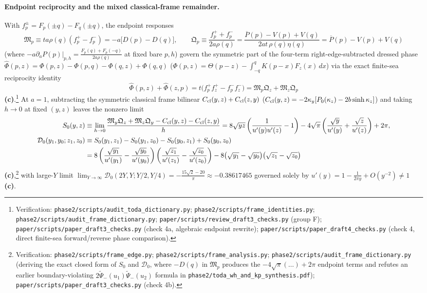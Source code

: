 \documentclass[11pt,a4paper]{article}
\newcommand{\lab}[1]{{\normalfont\sffamily\footnotesize\bfseries(#1)}}
\newcommand{\Lc}{\lab{c}}
\newcommand{\scr}[1]{\nolinkurl{#1}}
\newcommand{\chk}[1]{\footnote{\raggedright Verification: #1.}}
\theoremstyle{remark}
\begin{document}
\paragraph{Endpoint reciprocity and the mixed classical-frame remainder.} With $f_p^\pm=F_p(\pm q)-F_q(\pm q)$, the endpoint responses
\begin{equation}\label{eq:MQresp}
\mathfrak M_p\equiv ta\rho(q)(f_p^+-f_p^-)=-a\big[D(p)-D(q)\big],\qquad
\mathfrak Q_p\equiv\frac{f_p^++f_p^-}{2a\rho(q)}=\frac{\overline P(p)-V(p)+V(q)}{2at\,\rho(q)\eta(q)}=\overline P(p)-V(p)+V(q)
\end{equation}
(where $-a\partial_aP(p)|_{p,h}=\frac{F_p(q)+F_p(-q)}{2a\rho(q)}$ at fixed bare $p,h$) govern the symmetric part of the four-term right-edge-subtracted dressed phase $\widehat\Phi(p,z)=\Phi(p,z)-\Phi(p,q)-\Phi(q,z)+\Phi(q,q)$ ($\Phi(p,z)=\Theta(p-z)-\int_{-q}^qK(p-x)F_z(x)\,dx$) via the exact finite-sea reciprocity identity
\begin{equation}\label{eq:recip4}
\widehat\Phi(p,z)+\widehat\Phi(z,p)=t\big(f_p^+f_z^+-f_p^-f_z^-\big)=\mathfrak M_p\mathfrak Q_z+\mathfrak M_z\mathfrak Q_p
\end{equation}
\Lc.\chk{\scr{phase2/scripts/audit_toda_dictionary.py}; \scr{phase2/scripts/frame_identities.py}; \scr{phase2/scripts/audit_frame_dictionary.py}; \scr{paper/scripts/review_draft3_checks.py} (group F); \scr{paper/scripts/paper_draft3_checks.py} (check 4a, algebraic endpoint rewrite); \scr{paper/scripts/paper_draft4_checks.py} (check 4, direct finite-sea forward/reverse phase comparison)}
At $a=1$, subtracting the symmetric classical frame bilinear $C_{\rm cl}(y,z)+C_{\rm cl}(z,y)$ ($C_{\rm cl}(y,z)=-2\kappa_y[P_0(\kappa_z)-2b\sinh\kappa_z]$) and taking $h\to0$ at fixed $(y,z)$ leaves the nonzero limit
\begin{equation}\label{eq:S0D0}
\begin{aligned}
S_0(y,z)&\equiv\lim_{h\to0}\frac{\mathfrak M_y\mathfrak Q_z+\mathfrak M_z\mathfrak Q_y-C_{\rm cl}(y,z)-C_{\rm cl}(z,y)}{h}
=8\sqrt{yz}\left(\frac1{u'(y)u'(z)}-1\right)-4\sqrt\pi\left(\frac{\sqrt y}{u'(y)}+\frac{\sqrt z}{u'(z)}\right)+2\pi,\\
\mathcal D_0(y_1,y_0;z_1,z_0)&\equiv S_0(y_1,z_1)-S_0(y_1,z_0)-S_0(y_0,z_1)+S_0(y_0,z_0)\\
&=8\left(\frac{\sqrt{y_1}}{u'(y_1)}-\frac{\sqrt{y_0}}{u'(y_0)}\right)\left(\frac{\sqrt{z_1}}{u'(z_1)}-\frac{\sqrt{z_0}}{u'(z_0)}\right)-8\big(\sqrt{y_1}-\sqrt{y_0}\big)\big(\sqrt{z_1}-\sqrt{z_0}\big)
\end{aligned}
\end{equation}
\Lc,\chk{\scr{phase2/scripts/frame_edge.py}; \scr{phase2/scripts/frame_analysis.py}; \scr{phase2/scripts/audit_frame_dictionary.py} (deriving the exact closed form of $S_0$ and $\mathcal D_0$, where $-D(q)$ in $\mathfrak M_p$ produces the $-4\sqrt\pi(\dots)+2\pi$ endpoint terms and refutes an earlier boundary-violating $2\widetilde\Psi_-(u_1)\widetilde\Psi_-(u_2)$ formula in \scr{phase2/toda_wh_and_kp_synthesis.pdf}); \scr{paper/scripts/paper_draft3_checks.py} (check 4b)}
with large-$Y$ limit $\lim_{Y\to\infty}\mathcal D_0(2Y,Y;Y/2,Y/4)=-\frac{15\sqrt2-20}{\pi}\approx-0.38617465$ governed solely by $u'(y)=1-\frac1{2\pi y}+O(y^{-2})\neq1$ \Lc.
\end{document}
